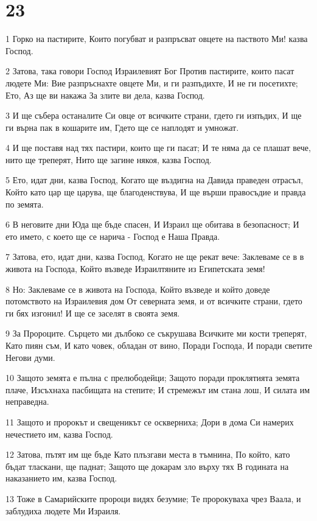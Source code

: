 \chapter{23}

\par 1 Горко на пастирите, Които погубват и разпръсват овцете на паството Ми! казва Господ.
\par 2 Затова, така говори Господ Израилевият Бог Против пастирите, които пасат людете Ми: Вие разпръснахте овцете Ми, и ги разпъдихте, И не ги посетихте; Ето, Аз ще ви накажа За злите ви дела, казва Господ.
\par 3 И ще събера останалите Си овце от всичките страни, гдето ги изпъдих, И ще ги върна пак в кошарите им, Гдето ще се наплодят и умножат.
\par 4 И ще поставя над тях пастири, които ще ги пасат; И те няма да се плашат вече, нито ще треперят, Нито ще загине някоя, казва Господ.
\par 5 Ето, идат дни, казва Господ, Когато ще въздигна на Давида праведен отрасъл, Който като цар ще царува, ще благоденствува, И ще върши правосъдие и правда по земята.
\par 6 В неговите дни Юда ще бъде спасен, И Израил ще обитава в безопасност; И ето името, с което ще се нарича - Господ е Наша Правда.
\par 7 Затова, ето, идат дни, казва Господ, Когато не ще рекат вече: Заклеваме се в в живота на Господа, Който възведе Израилтяните из Египетската земя!
\par 8 Но: Заклеваме се в живота на Господа, Който възведе и който доведе потомството на Израилевия дом От северната земя, и от всичките страни, гдето ги бях изгонил! И ще се заселят в своята земя.
\par 9 За Пророците. Сърцето ми дълбоко се съкрушава Всичките ми кости треперят, Като пиян съм, И като човек, обладан от вино, Поради Господа, И поради светите Негови думи.
\par 10 Защото земята е пълна с прелюбодейци; Защото поради проклятията земята плаче, Изсъхнаха пасбищата на степите; И стремежът им стана лош, И силата им неправедна.
\par 11 Защото и пророкът и свещеникът се оскверниха; Дори в дома Си намерих нечестието им, казва Господ.
\par 12 Затова, пътят им ще бъде Като плъзгави места в тъмнина, По който, като бъдат тласкани, ще паднат; Защото ще докарам зло върху тях В годината на наказанието им, казва Господ.
\par 13 Тоже в Самарийските пророци видях безумие; Те пророкуваха чрез Ваала, и заблудиха людете Ми Израиля.

